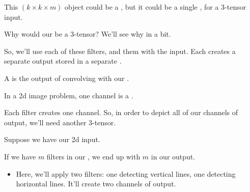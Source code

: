         \begin{clarification}
            This $(k \times k \times m)$ object could be a , but it could  be a single , for a 3-tensor input.

            Why would our  be a 3-tensor? We'll see why in a bit.
        \end{clarification}

        So, we'll use each of these filters, and  them with the input. Each creates a separate output stored in a separate .\\

        \begin{concept}
            A  is the output of convolving  with our .

            In a 2d image problem, one channel is a .
        \end{concept}

        Each filter creates one channel. So, in order to depict all of our channels of output, we'll need another 3-tensor.\\

        \begin{concept}
            Suppose we have our 2d input.

            If we have $m$ filters in our , we end up with $m$  in our output.
        \end{concept}

        \begin{itemize}
            \item \miniex Here, we'll apply two filters: one detecting vertical lines, one detecting horizontal lines. It'll create two channels of output.
        \end{itemize}

